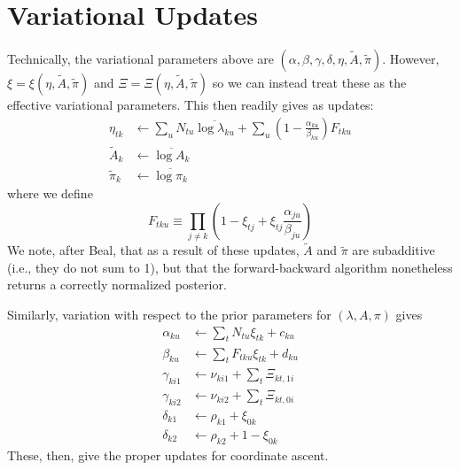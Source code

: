 \documentclass[11pt]{article}
\begin{document}
\section{Variational Updates}
Technically, the variational parameters above are $(\alpha, \beta, \gamma, \delta, \eta, \tilde{A}, \tilde{\pi})$. However, $\xi = \xi(\eta, \tilde{A}, \tilde{\pi})$ and $\Xi = \Xi(\eta, \tilde{A}, \tilde{\pi})$ so we can instead treat these as the effective variational parameters. This then readily gives as updates:
\begin{align}
\eta_{tk} &\leftarrow \sum_u N_{tu} \overline{\log \lambda_{ku}} + 
\sum_u \left( 1 - \frac{\alpha_{ku}}{\beta_{ku}}\right) F_{tku} \\
\tilde{A}_{k} &\leftarrow \overline{\log A_k} \\
\tilde{\pi}_k &\leftarrow \overline{\log \pi_k}
\end{align}
where we define
\begin{equation}
    F_{tku} \equiv \prod_{j \neq k} \left( 1 - \xi_{tj} + \xi_{tj} \frac{\alpha_{ju}}{\beta_{ju}}\right)
\end{equation}
We note, after Beal, that as a result of these updates, $\tilde{A}$ and $\tilde{\pi}$ are subadditive (i.e., they do not sum to 1), but that the forward-backward algorithm nonetheless returns a correctly normalized posterior.


Similarly, variation with respect to the prior parameters for $(\lambda, A, \pi)$ gives
\begin{align}
    \alpha_{ku} &\leftarrow \sum_t N_{tu} \xi_{tk} + c_{ku} \\
    \beta_{ku} &\leftarrow \sum_t F_{tku}\xi_{tk} + d_{ku} \\
    \gamma_{ki1} &\leftarrow \nu_{ki1} + \sum_t \Xi_{kt, 1i} \\
    \gamma_{ki2} &\leftarrow \nu_{ki2} + \sum_t \Xi_{kt, 0i} \\
    \delta_{k1} &\leftarrow \rho_{k1} + \xi_{0k} \\
    \delta_{k2} &\leftarrow \rho_{k2} + 1 - \xi_{0k} 
\end{align}
These, then, give the proper updates for coordinate ascent.
\end{document}
